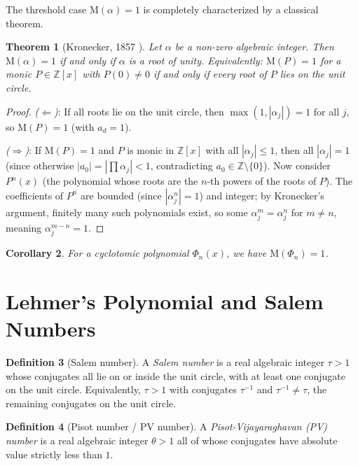 \documentclass[12pt,a4paper]{amsart}
\newtheorem{theorem}{Theorem}[section]
\newtheorem{corollary}[theorem]{Corollary}
\theoremstyle{definition}
\newtheorem{definition}[theorem]{Definition}
\theoremstyle{remark}
\newcommand{\Z}{\mathbb{Z}}
\newcommand{\M}{\mathrm{M}}
\begin{document}
The threshold case $\M(\alpha) = 1$ is completely characterized by a classical theorem.

\begin{theorem}[Kronecker, 1857 \cite{Kronecker1857}]\label{thm:kronecker}
  Let $\alpha$ be a non-zero algebraic integer. Then $\M(\alpha) = 1$ if and only if
  $\alpha$ is a root of unity.
  Equivalently: $\M(P) = 1$ for a monic $P \in \Z[x]$ with $P(0) \neq 0$ if and only if
  every root of $P$ lies on the unit circle.
\end{theorem}

\begin{proof}
  \emph{($\Leftarrow$)}: If all roots lie on the unit circle, then
  $\max(1,|\alpha_j|) = 1$ for all $j$, so $\M(P) = 1$ (with $a_d = 1$).

  \emph{($\Rightarrow$)}: If $\M(P) = 1$ and $P$ is monic in $\Z[x]$ with all
  $|\alpha_j| \leq 1$, then all $|\alpha_j| = 1$ (since otherwise $|a_0| = |\prod \alpha_j| < 1$,
  contradicting $a_0 \in \Z\setminus\{0\}$). Now consider $P^n(x)$ (the polynomial
  whose roots are the $n$-th powers of the roots of $P$). The coefficients of $P^n$ are
  bounded (since $|\alpha_j^n| = 1$) and integer; by Kronecker's argument, finitely many
  such polynomials exist, so some $\alpha_j^m = \alpha_j^n$ for $m \neq n$, meaning
  $\alpha_j^{m-n} = 1$.
\end{proof}

\begin{corollary}
  For a cyclotomic polynomial $\Phi_n(x)$, we have $\M(\Phi_n) = 1$.
\end{corollary}

\section{Lehmer's Polynomial and Salem Numbers}\label{sec:lehmer_poly}

\begin{definition}[Salem number]
  A \emph{Salem number} is a real algebraic integer $\tau > 1$ whose conjugates all lie
  on or inside the unit circle, with at least one conjugate on the unit circle.
  Equivalently, $\tau > 1$ with conjugates $\tau^{-1}$ and $\tau^{-1} \neq \tau$,
  the remaining conjugates on the unit circle.
\end{definition}

\begin{definition}[Pisot number / PV number]
  A \emph{Pisot-Vijayaraghavan (PV) number} is a real algebraic integer $\theta > 1$
  all of whose conjugates have absolute value strictly less than $1$.
\end{definition}
\end{document}

